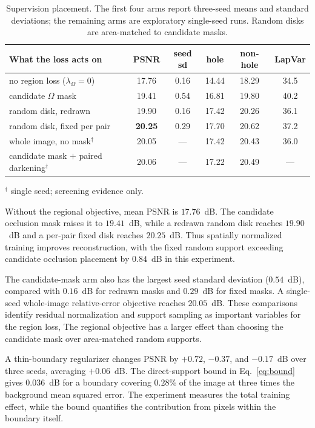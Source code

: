 \begin{table}[t]
\centering
\caption{Supervision placement. The first four arms report three-seed means and standard
deviations; the remaining arms are exploratory single-seed runs. Random disks are area-matched to candidate masks.}
\label{tab:placement}
\small
\setlength{\tabcolsep}{6pt}
\begin{tabular}{@{}lccccc@{}}
\toprule
What the loss acts on & PSNR & seed sd & hole & non-hole & LapVar \\
\midrule
no region loss ($\lambda_\Omega=0$) & 17.76 & 0.16 & 14.44 & 18.29 & 34.5 \\
candidate $\Omega$ mask & 19.41 & 0.54 & 16.81 & 19.80 & 40.2 \\
random disk, redrawn & 19.90 & 0.16 & 17.42 & 20.26 & 36.1 \\
random disk, fixed per pair & \textbf{20.25} & 0.29 & 17.70 & 20.62 & 37.2 \\
\midrule
whole image, no mask$^\dagger$ & 20.05 & --- & 17.42 & 20.43 & 36.0 \\
candidate mask $+$ paired darkening$^\dagger$ & 20.06 & --- & 17.22 & 20.49 & --- \\
\bottomrule
\end{tabular}\par
\vspace{2pt}
\noindent\footnotesize $^\dagger$ single seed; screening evidence only.
\end{table}


Without the regional objective, mean PSNR is
$17.76$~dB. The candidate occlusion mask raises
it to $19.41$~dB, while a redrawn random disk
reaches $19.90$~dB and a per-pair fixed disk
reaches $20.25$~dB. Thus spatially normalized
training improves reconstruction, with the fixed
random support exceeding candidate occlusion
placement by $0.84$~dB in this experiment.

The candidate-mask arm also has the largest
seed standard deviation ($0.54$~dB), compared
with $0.16$~dB for redrawn masks and $0.29$~dB
for fixed masks. A single-seed whole-image
relative-error objective reaches $20.05$~dB.
These comparisons identify residual normalization
and support sampling as important variables for
the region loss, The regional objective has a larger
effect than choosing the candidate mask
over area-matched random supports.

A thin-boundary regularizer changes PSNR by
$+0.72$, $-0.37$, and $-0.17$~dB over three seeds,
averaging $+0.06$~dB. The direct-support bound
in Eq.~\eqref{eq:bound} gives $0.036$~dB for a
boundary covering $0.28\%$ of the image at three
times the background mean squared error. The
experiment measures the total training effect,
while the bound quantifies the contribution from
pixels within the boundary itself.

